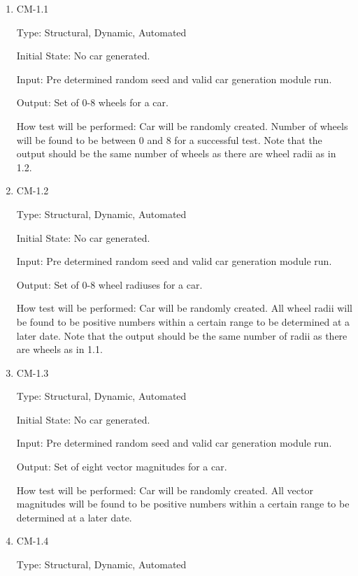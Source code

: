 \documentclass[12pt, titlepage]{article}
\begin{document}
\begin{enumerate}

\item{CM-1.1\\}

Type: Structural, Dynamic, Automated
					
Initial State: No car generated.
					
Input: Pre determined random seed and valid car generation module run.
					
Output: Set of 0-8 wheels for a car.
					
How test will be performed: Car will be randomly created. Number of wheels will 
be found to be between 0 and 8 for a successful test. Note that the output 
should be the same number of wheels as there are wheel radii as in 1.2.

\item{CM-1.2\\}

Type: Structural, Dynamic, Automated
					
Initial State: No car generated.
					
Input: Pre determined random seed and valid  car generation module run.
					
Output: Set of 0-8 wheel radiuses for a car.
					
How test will be performed: Car will be randomly created. All wheel radii
will be found to be positive numbers within a certain range to be determined at 
a later date. Note that the output should be the same number of radii as 
there are wheels as in 1.1.

\item{CM-1.3\\}

Type: Structural, Dynamic, Automated
					
Initial State: No car generated.
					
Input: Pre determined random seed and valid  car generation module run.
					
Output: Set of eight vector magnitudes for a car.
					
How test will be performed: Car will be randomly created. All vector magnitudes 
will be found to be positive numbers within a certain range to be determined at 
a later date.

\item{CM-1.4\\}

Type: Structural, Dynamic, Automated
					

\end{enumerate}
\end{document}
